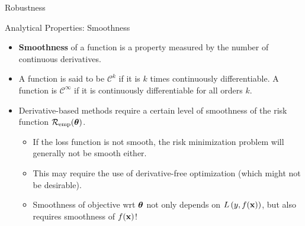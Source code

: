\documentclass[11pt,compress,t,notes=noshow, xcolor=table]{beamer}
\begin{document}
\begin{vbframe}{Robustness}
% 
% 

\end{vbframe}


\begin{vbframe}{Analytical Properties: Smoothness}


\begin{itemize}
  \small
  \item \textbf{Smoothness} of a function is a property measured by 
  the number of continuous derivatives. 
  \item A function is said to be $\mathcal{C}^k$ if it is $k$ times 
  continuously differentiable. A function is $\mathcal{C}^\infty$ if it is 
  continuously differentiable for all orders $k$. 
  \item Derivative-based methods require a certain level of smoothness of the 
  risk function $\mathcal{R}_{\text{emp}}(\bm{\theta})$. 
  \begin{itemize}
    \small
    \item If the loss function is not smooth, the risk minimization problem will
    generally not be smooth either. 
    \item This may require the use of derivative-free optimization (which 
    might not be desirable).
    \item Smoothness of objective wrt $\bm{\theta}$ not only depends on $L\left(y, f(\mathbf{x})\right)$, but also requires smoothness of $f(\mathbf{x})$! 
  \end{itemize}
\end{itemize}

\vfill


\end{vbframe}
\end{document}
